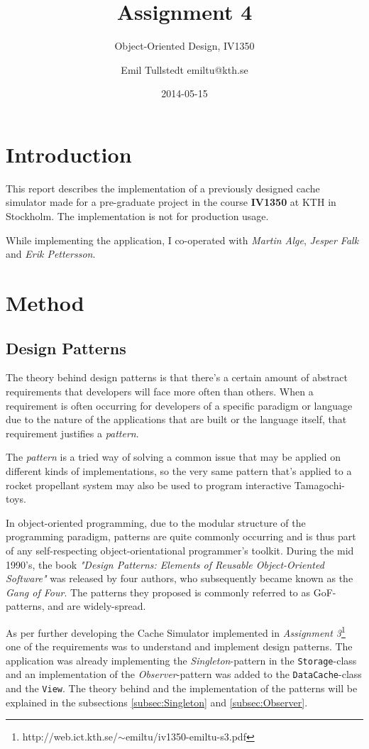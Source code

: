 \documentclass[a4paper]{scrreprt}
\title{Assignment 4}
\subtitle{Object-Oriented Design, IV1350}
\author{Emil Tullstedt emiltu@kth.se}
\date{2014-05-15}
\begin{document}
\maketitle

\tableofcontents %

\chapter{Introduction}
This report describes the implementation of a previously designed cache simulator made for a pre-graduate project in the course \textbf{IV1350} at KTH in Stockholm. The implementation is not for production usage.

\begin{small}
While implementing the application, I co-operated with \textit{Martin Alge}, \textit{Jesper Falk} and \textit{Erik Pettersson}.
\end{small}

\chapter{Method}
\section{Design Patterns}
The theory behind design patterns is that there's a certain amount of abstract requirements that developers will face more often than others. When a requirement is often occurring for developers of a specific paradigm or language due to the nature of the applications that are built or the language itself, that requirement justifies a \textit{pattern}.

The \textit{pattern} is a tried way of solving a common issue that may be applied on different kinds of implementations, so the very same pattern that's applied to a rocket propellant system may also be used to program interactive Tamagochi-toys.

In object-oriented programming, due to the modular structure of the programming paradigm, patterns are quite commonly occurring and is thus part of any self-respecting object-orientational programmer's toolkit. During the mid 1990's, the book \textit{"Design Patterns: Elements of Reusable Object-Oriented Software"} was released by four authors, who subsequently became known as the \textit{Gang of Four}. The patterns they proposed is commonly referred to as GoF-patterns, and are widely-spread.

As per further developing the Cache Simulator implemented in \textit{Assignment 3}\footnote{http://web.ict.kth.se/$\sim$emiltu/iv1350-emiltu-s3.pdf} one of the requirements was to understand and implement design patterns. The application was already implementing the \textit{Singleton}-pattern in the \texttt{Storage}-class and an implementation of the \textit{Observer}-pattern was added to the \texttt{DataCache}-class and the \texttt{View}. The theory behind and the implementation of the patterns will be explained in the subsections \ref{subsec:Singleton} and \ref{subsec:Observer}.
\end{document}
